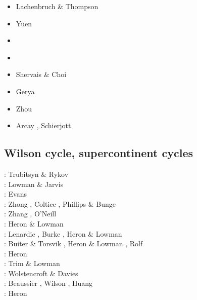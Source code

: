 \begin{scriptsize}
\begin{itemize}
\item[\nineteenseventytwo] Lachenbruch \& Thompson \cite{lath72}
\item[\nineteenseventyeight] Yuen \etal \cite{yufs78}
\item[\twothousandseven] \cite{macl07}
\item[\twothousandten] \cite{gerya2010}
\item[\twothousandtwelve] Shervais \& Choi \cite{shch12}
\item[\twothousandthirteen] Gerya \cite{gery13c}
\item[\twothousandeighteen] Zhou \etal \cite{zhlg18}
\item[\twothousandtwenty] Arcay \etal \cite{arla20}, Schierjott \etal \cite{sctr20}
\end{itemize}
\end{scriptsize}

\subsection{Wilson cycle, supercontinent cycles}

\begin{scriptsize}
\nineteenninetyfive: Trubitsyn \& Rykov \cite{trry95}\\
\nineteenninetynine: Lowman \& Jarvis \cite{loja99}\\
\twothousandthree: Evans \cite{evan03}\\
\twothousandseven: Zhong \etal \cite{zhzl07}, Coltice \etal \cite{copb07}, 
                   Phillips \& Bunge \cite{phbu07}\\
\twothousandnine: Zhang \etal \cite{zhzm09}, O'Neill \etal \cite{onlj09}\\
\twothousandten: Heron \& Lowman \cite{helo10}\\
\twothousandeleven: Lenardic \etal \cite{lemj11}, Burke \cite{burk11}, Heron \& Lowman \cite{helo11}\\
\twothousandfourteen: Buiter \& Torsvik \cite{buto14}, Heron \& Lowman \cite{helo14}, 
                      Rolf \etal \cite{roct14}\\
\twothousandfifteen: Heron \etal \cite{hels15}\\
\twothousandsixteen: Trim \& Lowman \cite{trlo16}\\
\twothousandseventeen: Wolstencroft \& Davies \cite{woda17}\\
\twothousandnineteen: Beaussier \etal \cite{begb19}, Wilson \etal \cite{wihb19}, 
                      Huang \etal \cite{huzl19}\\
\twothousandtwenty: Heron \etal \cite{hemn20}
\end{scriptsize}

